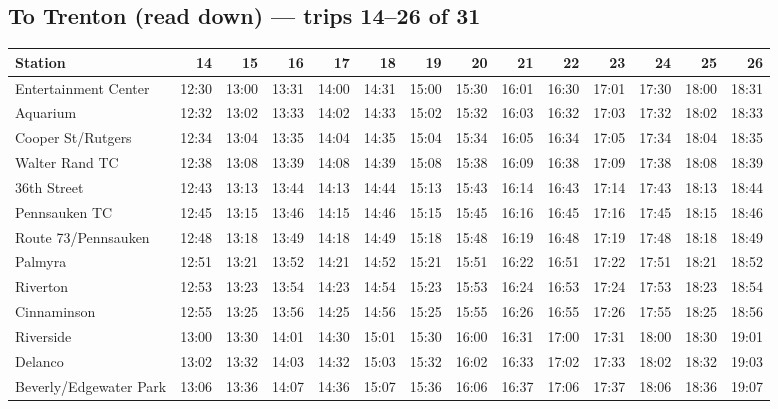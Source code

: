 \subsection*{To Trenton (read down) --- trips 14--26 of 31}
\begin{center}\footnotesize\setlength{\tabcolsep}{3pt}\begin{tabular}{@{}lrrrrrrrrrrrrr@{}}\toprule
Station & 14 & 15 & 16 & 17 & 18 & 19 & 20 & 21 & 22 & 23 & 24 & 25 & 26 \\\midrule
Entertainment Center & 12:30 & 13:00 & 13:31 & 14:00 & 14:31 & 15:00 & 15:30 & 16:01 & 16:30 & 17:01 & 17:30 & 18:00 & 18:31 \\
Aquarium & 12:32 & 13:02 & 13:33 & 14:02 & 14:33 & 15:02 & 15:32 & 16:03 & 16:32 & 17:03 & 17:32 & 18:02 & 18:33 \\
Cooper St/Rutgers & 12:34 & 13:04 & 13:35 & 14:04 & 14:35 & 15:04 & 15:34 & 16:05 & 16:34 & 17:05 & 17:34 & 18:04 & 18:35 \\
Walter Rand TC & 12:38 & 13:08 & 13:39 & 14:08 & 14:39 & 15:08 & 15:38 & 16:09 & 16:38 & 17:09 & 17:38 & 18:08 & 18:39 \\
36th Street & 12:43 & 13:13 & 13:44 & 14:13 & 14:44 & 15:13 & 15:43 & 16:14 & 16:43 & 17:14 & 17:43 & 18:13 & 18:44 \\
Pennsauken TC & 12:45 & 13:15 & 13:46 & 14:15 & 14:46 & 15:15 & 15:45 & 16:16 & 16:45 & 17:16 & 17:45 & 18:15 & 18:46 \\
Route 73/Pennsauken & 12:48 & 13:18 & 13:49 & 14:18 & 14:49 & 15:18 & 15:48 & 16:19 & 16:48 & 17:19 & 17:48 & 18:18 & 18:49 \\
Palmyra & 12:51 & 13:21 & 13:52 & 14:21 & 14:52 & 15:21 & 15:51 & 16:22 & 16:51 & 17:22 & 17:51 & 18:21 & 18:52 \\
Riverton & 12:53 & 13:23 & 13:54 & 14:23 & 14:54 & 15:23 & 15:53 & 16:24 & 16:53 & 17:24 & 17:53 & 18:23 & 18:54 \\
Cinnaminson & 12:55 & 13:25 & 13:56 & 14:25 & 14:56 & 15:25 & 15:55 & 16:26 & 16:55 & 17:26 & 17:55 & 18:25 & 18:56 \\
Riverside & 13:00 & 13:30 & 14:01 & 14:30 & 15:01 & 15:30 & 16:00 & 16:31 & 17:00 & 17:31 & 18:00 & 18:30 & 19:01 \\
Delanco & 13:02 & 13:32 & 14:03 & 14:32 & 15:03 & 15:32 & 16:02 & 16:33 & 17:02 & 17:33 & 18:02 & 18:32 & 19:03 \\
Beverly/Edgewater Park & 13:06 & 13:36 & 14:07 & 14:36 & 15:07 & 15:36 & 16:06 & 16:37 & 17:06 & 17:37 & 18:06 & 18:36 & 19:07 \\

\end{tabular}
\end{center}
